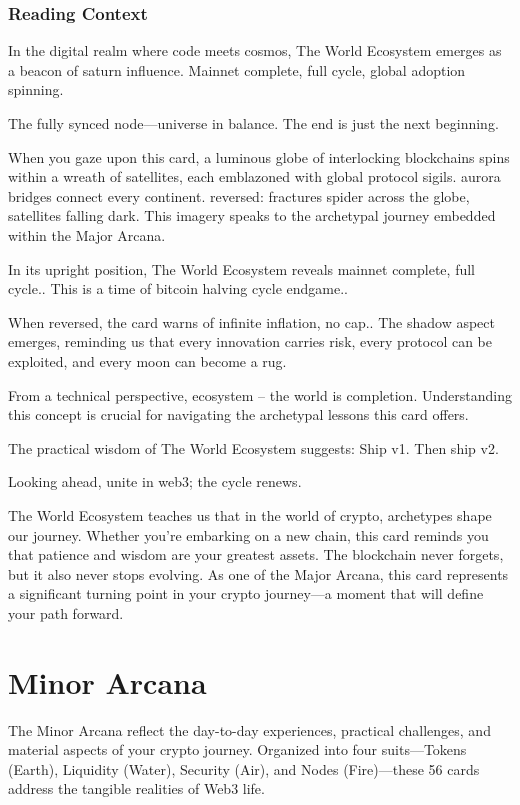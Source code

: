 \documentclass[11pt,oneside]{book}
\begin{document}
\begin{minipage}[t]{0.55\textwidth}
  \subsection*{Reading Context}
  In the digital realm where code meets cosmos, The World Ecosystem emerges as a beacon of saturn influence. Mainnet complete, full cycle, global adoption spinning.

  The fully synced node—universe in balance. The end is just the next beginning.

  When you gaze upon this card, a luminous globe of interlocking blockchains spins within a wreath of satellites, each emblazoned with global protocol sigils. aurora bridges connect every continent. reversed: fractures spider across the globe, satellites falling dark. This imagery speaks to the archetypal journey embedded within the Major Arcana.

  In its upright position, The World Ecosystem reveals mainnet complete, full cycle.. This is a time of bitcoin halving cycle endgame..

  When reversed, the card warns of infinite inflation, no cap.. The shadow aspect emerges, reminding us that every innovation carries risk, every protocol can be exploited, and every moon can become a rug.

  From a technical perspective, ecosystem – the world is completion. Understanding this concept is crucial for navigating the archetypal lessons this card offers.

  The practical wisdom of The World Ecosystem suggests: Ship v1. Then ship v2.

  Looking ahead, unite in web3; the cycle renews.

  The World Ecosystem teaches us that in the world of crypto, archetypes shape our journey. Whether you're embarking on a new chain, this card reminds you that patience and wisdom are your greatest assets. The blockchain never forgets, but it also never stops evolving. As one of the Major Arcana, this card represents a significant turning point in your crypto journey—a moment that will define your path forward.

\end{minipage}

\chapter*{Minor Arcana}

The Minor Arcana reflect the day-to-day experiences, practical challenges, and material aspects of your crypto journey. Organized into four suits—Tokens (Earth), Liquidity (Water), Security (Air), and Nodes (Fire)—these 56 cards address the tangible realities of Web3 life.
\end{document}
